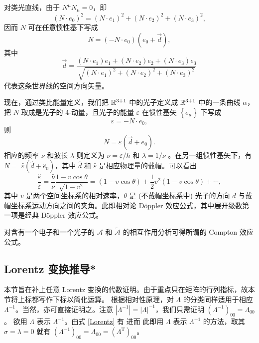 对类光直线，由于 $N^\mu N_\mu=0$，即
\[
(N \cdot e_{0})^2=\left(N \cdot e_{1}\right)^{2}+\left(N \cdot e_{2}\right)^{2}+\left(N \cdot e_{3}\right)^{2},
\]
因而 $N$ 可在任意惯性基下写成
\[N=\left(-N \cdot e_{0}\right)\left(e_{0}+\vec d\right),\]
其中
\[\vec d
=\frac{\left(N \cdot e_{1}\right) e_{1}+\left(N \cdot e_{2}\right) e_{2}+\left(N \cdot e_{3}\right) e_{3}}{\sqrt{\left(N \cdot e_{1}\right)^{2}+\left(N \cdot e_{2}\right)^{2}+\left(N \cdot e_{3}\right)^{2}}}\]
代表这条世界线的空间方向矢量。

现在，通过类比能量定义，我们把 $\mathbb{R}^{3+1}$ 中的光子定义成 $\mathbb{R}^{3+1}$ 中的一条曲线 $\alpha$，把 $N$ 取成是光子的 4-动量，且光子的能量 $\varepsilon$ 在惯性基矢 $\left\{e_{\mu}\right\}$ 下写成
\[\varepsilon=-N \cdot e_{0},\]
则
\[N=\varepsilon\left(\vec d+e_{0}\right).\]
相应的频率 $\nu$ 和波长 $\lambda$ 则定义为 $\nu=\varepsilon / h$ 和 $\lambda=1 / \nu$ 。在另一组惯性基矢下，有 $N=$ $\hat{\varepsilon}(\hat{d}+\hat{e}_{0})$，其中 $\hat{d}$ 和 $\hat{\varepsilon}$ 是相应物理量的戴帽。可以看出
\[\frac{\hat{\varepsilon}}{\varepsilon}=\frac{\hat{\nu}}{\nu} \frac{1-v \cos \theta}{\sqrt{1-v^{2}}}=(1-v \cos \theta)+\frac{1}{2} v^{2}(1-v \cos \theta)+\cdots,\]
其中 $v$ 是两个空间坐标系的相对速率，$\theta$ 是 (不戴帽坐标系中) 光子的方向 $d$ 与戴帽坐标系运动方向之间的夹角。此即相对论 D\"oppler 效应公式，其中展开级数第一项是经典 D\"oppler 效应公式。



对含有一个电子和一个光子的 $\mathcal{A}$ 和 $\widetilde{\mathcal{A}}$ 的相互作用分析可得所谓的 Compton 效应公式。

\subsection{Lorentz 变换推导*}\label{sec:PoincareLorentz}

本节旨在补上任意 Lorentz 变换的代数证明。由于重点只在矩阵的行列指标，故本节将上标都写作下标以简化运算。
根据相对性原理，对 $\Lambda$ 的分类同样适用于相应 $\Lambda^{-1}$。当然，亦可直接证明之。注意 $|\Lambda^{-1}|=|\Lambda|^{-1}$，我们只需证明 $(\Lambda^{-1})_{00}=\Lambda_{00}$。
欲用 $\Lambda$ 表示 $\Lambda^{-1}$。由式 \eqref{Lorentz} 有
进而
此即用 $\Lambda$ 表示 $\Lambda^{-1}$ 的方法，取其 $\sigma=\lambda=0$ 就有 $(\Lambda^{-1})_{00}=\Lambda_{00}=(\Lambda^\mathrm{T})_{00}$。

